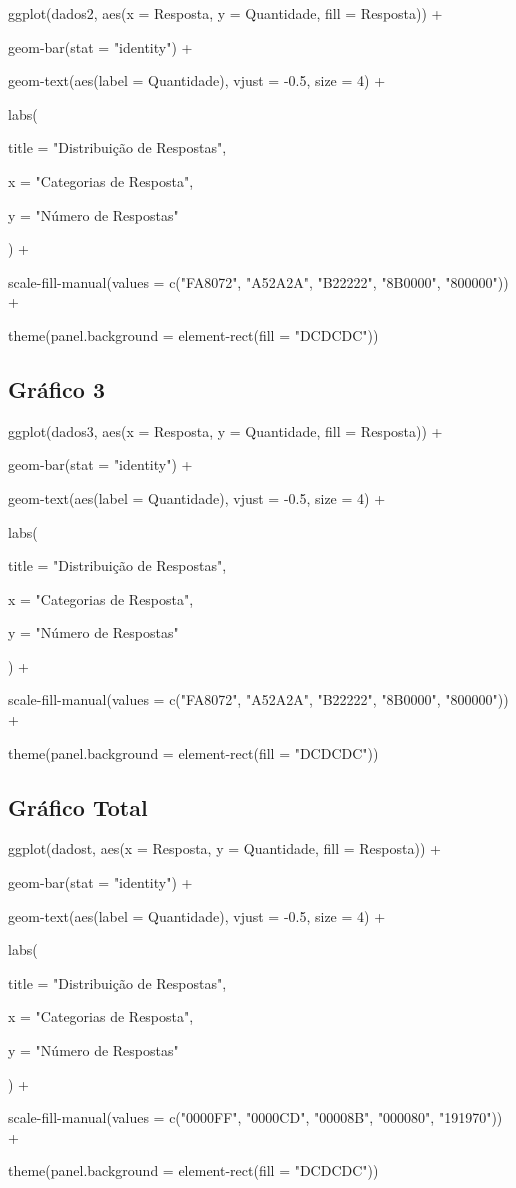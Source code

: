 \documentclass{article}
\begin{document}
ggplot(dados2, aes(x = Resposta, y = Quantidade, fill = Resposta)) +

  geom-bar(stat = "identity") +
  
  geom-text(aes(label = Quantidade), vjust = -0.5, size = 4) +
  
  labs(
  
    title = "Distribuição de Respostas",
    
    x = "Categorias de Resposta",
    
    y = "Número de Respostas"
    
  ) +
  
  scale-fill-manual(values = c("FA8072", "A52A2A", "B22222", "8B0000", "800000")) +
  
  theme(panel.background = element-rect(fill = "DCDCDC"))

\subsection{Gráfico 3}

ggplot(dados3, aes(x = Resposta, y = Quantidade, fill = Resposta)) +

  geom-bar(stat = "identity") +
  
  geom-text(aes(label = Quantidade), vjust = -0.5, size = 4) +
  
  labs(
  
    title = "Distribuição de Respostas",

    x = "Categorias de Resposta",
    
    y = "Número de Respostas"
    
  ) +
  
  scale-fill-manual(values = c("FA8072", "A52A2A", "B22222", "8B0000", "800000")) +
  
  theme(panel.background = element-rect(fill = "DCDCDC"))

\subsection{Gráfico Total}

ggplot(dadost, aes(x = Resposta, y = Quantidade, fill = Resposta)) +

  geom-bar(stat = "identity") +
  
  geom-text(aes(label = Quantidade), vjust = -0.5, size = 4) +
  
  labs(
  
    title = "Distribuição de Respostas",
    
    x = "Categorias de Resposta",
    
    y = "Número de Respostas"
    
  ) +
  
  scale-fill-manual(values = c("0000FF", "0000CD", "00008B", "000080", "191970")) +
  
  theme(panel.background = element-rect(fill = "DCDCDC"))
\end{document}
